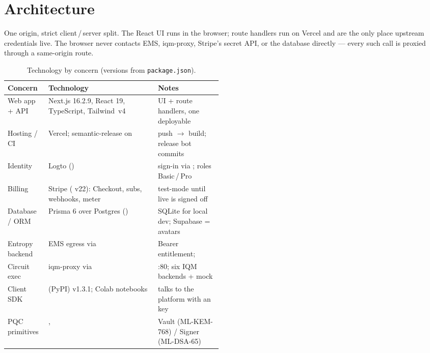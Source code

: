 \documentclass[11pt]{article}
\begin{document}
\section{Architecture}
One origin, strict client\,/\,server split. The React UI runs in the browser; route handlers run on Vercel and are the
only place upstream credentials live. The browser never contacts EMS, iqm-proxy, Stripe's secret API, or the database
directly --- every such call is proxied through a same-origin route.

\begin{table}[h]
\centering\small
\begin{tabularx}{\linewidth}{@{}>{\raggedright\arraybackslash}p{0.19\linewidth} Y >{\raggedright\arraybackslash}p{0.30\linewidth}@{}}
\toprule
\textbf{Concern} & \textbf{Technology} & \textbf{Notes}\\
\midrule
Web app + API & Next.js 16.2.9, React 19, TypeScript, Tailwind~v4 & UI + route handlers, one deployable\\
Hosting / CI & Vercel; semantic-release on  & push $\to$ build; release bot commits \\
Identity & Logto () & sign-in via ; roles Basic\,/\,Pro\\
Billing & Stripe ( v22): Checkout, subs, webhooks, meter & test-mode until live is signed off\\
Database / ORM & Prisma 6 over Postgres () & SQLite for local dev; Supabase = avatars\\
Entropy backend & EMS egress via  & Bearer entitlement; \\
Circuit exec & iqm-proxy via  & :80; six IQM backends + mock\\
Client SDK &  (PyPI) v1.3.1; Colab notebooks & talks to the platform with an  key\\
PQC primitives & ,  & Vault (ML-KEM-768) / Signer (ML-DSA-65)\\
\bottomrule
\end{tabularx}
\caption{Technology by concern (versions from \texttt{package.json}).}
\end{table}
\end{document}
